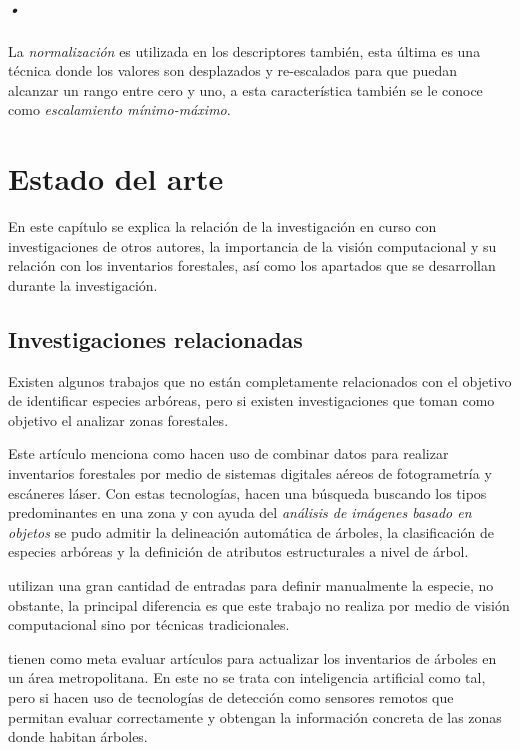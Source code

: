 \paragraph{•} La \emph{normalización} es utilizada en los descriptores también, esta última es una técnica donde los valores son desplazados y re-escalados  para que puedan alcanzar un rango entre cero y uno, a esta característica también se le conoce como \emph{escalamiento mínimo-máximo}.

\chapter{Estado del arte}
En este capítulo se explica la relación de la investigación en curso con investigaciones de otros autores, la importancia de la visión computacional y su relación con los inventarios forestales, así como los apartados que se desarrollan durante la investigación.

\section{Investigaciones relacionadas}
Existen algunos trabajos que no están completamente relacionados con el objetivo de identificar especies arbóreas, pero si existen investigaciones que toman como objetivo el analizar zonas forestales.

Este artículo menciona como hacen uso de combinar datos para realizar inventarios forestales por medio de sistemas digitales aéreos de fotogrametría y escáneres láser. Con estas tecnologías, hacen una búsqueda buscando los tipos predominantes en una zona y con ayuda del \emph{análisis de imágenes basado en objetos} se pudo admitir la delineación automática de árboles, la clasificación de especies arbóreas y la definición de atributos estructurales a nivel de árbol. 
\newline
\break


\citet{rf1} utilizan una gran cantidad de entradas para definir manualmente la especie, no obstante, la principal diferencia es que este trabajo no realiza por medio de visión computacional sino por técnicas tradicionales.
 
\citet{rf2} tienen como meta evaluar artículos para actualizar los inventarios de árboles en un área metropolitana. En este no se trata con inteligencia artificial como tal, pero si hacen uso de tecnologías de detección como sensores remotos que permitan evaluar correctamente y obtengan la información concreta de las zonas donde habitan  árboles.

